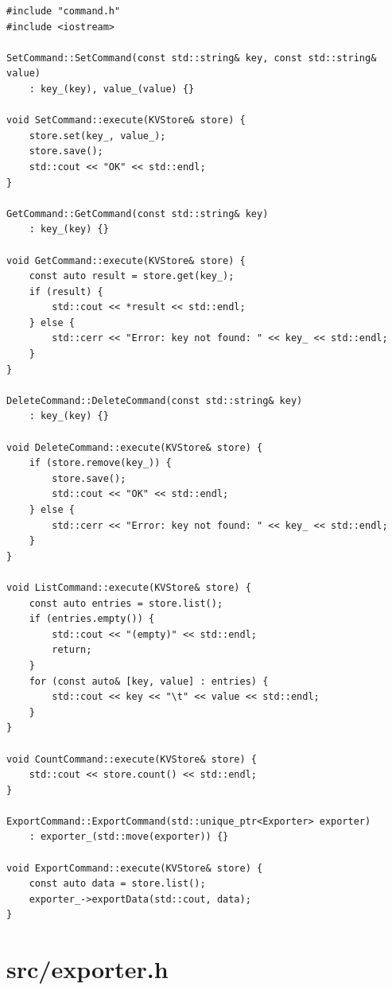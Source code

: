 \documentclass[11pt,a4paper]{book}
\newcommand{\file}[1]{\texttt{#1}}
\begin{document}
\begin{lstlisting}[style=cpp,title={\file{src/command.cpp}}]
#include "command.h"
#include <iostream>

SetCommand::SetCommand(const std::string& key, const std::string& value)
    : key_(key), value_(value) {}

void SetCommand::execute(KVStore& store) {
    store.set(key_, value_);
    store.save();
    std::cout << "OK" << std::endl;
}

GetCommand::GetCommand(const std::string& key)
    : key_(key) {}

void GetCommand::execute(KVStore& store) {
    const auto result = store.get(key_);
    if (result) {
        std::cout << *result << std::endl;
    } else {
        std::cerr << "Error: key not found: " << key_ << std::endl;
    }
}

DeleteCommand::DeleteCommand(const std::string& key)
    : key_(key) {}

void DeleteCommand::execute(KVStore& store) {
    if (store.remove(key_)) {
        store.save();
        std::cout << "OK" << std::endl;
    } else {
        std::cerr << "Error: key not found: " << key_ << std::endl;
    }
}

void ListCommand::execute(KVStore& store) {
    const auto entries = store.list();
    if (entries.empty()) {
        std::cout << "(empty)" << std::endl;
        return;
    }
    for (const auto& [key, value] : entries) {
        std::cout << key << "\t" << value << std::endl;
    }
}

void CountCommand::execute(KVStore& store) {
    std::cout << store.count() << std::endl;
}

ExportCommand::ExportCommand(std::unique_ptr<Exporter> exporter)
    : exporter_(std::move(exporter)) {}

void ExportCommand::execute(KVStore& store) {
    const auto data = store.list();
    exporter_->exportData(std::cout, data);
}
\end{lstlisting}

\section{src/exporter.h}
\end{document}
